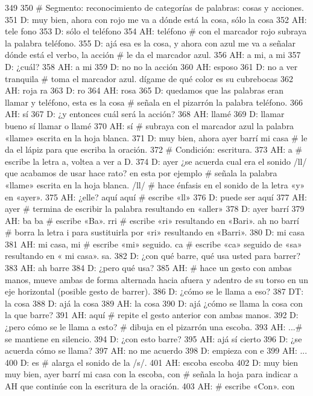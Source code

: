 349 
350 # Segmento: reconocimiento de categorías de palabras: cosas y acciones.
351 D: muy bien, ahora con rojo me va a dónde está la cosa, sólo la cosa
352 AH: tele fono
353 D: sólo el teléfono
354 AH: teléfono # con el marcador rojo subraya la palabra teléfono.
355 D: ajá esa es la cosa, y ahora con azul me va a señalar dónde está el verbo, la acción # le da el marcador azul.
356 AH: a mi, a mi
357 D: ¿cuál?
358 AH: a mi
359 D: no no la acción
360 AH: esposo
361 D: no a ver tranquila # toma el marcador azul. dígame de qué color es su cubrebocas
362 AH: roja ra
363 D: ro
364 AH: rosa
365 D: quedamos que las palabras eran llamar y teléfono, esta es la cosa # señala en el pizarrón la palabra teléfono.
366 AH: sí
367 D: ¿y entonces cuál será la acción?
368 AH: llamé
369 D: llamar bueno sí llamar o llamé
370 AH: sí # subraya con el marcador azul la palabra «llame» escrita en la hoja blanca.
371 D: muy bien, ahora ayer barrí mi casa # le da el lápiz para que escriba la oración.
372 # Condición: escritura.
373 AH: a # escribe la letra a, voltea a ver a D.
374 D: ayer ¿se acuerda cual era el sonido /ll/ que acabamos de usar hace rato? en esta por ejemplo # señala la palabra «llame» escrita en la hoja blanca. /ll/ # hace énfasis en el sonido de la letra «y» en «ayer».
375 AH: ¿elle? aquí aquí # escribe «ll»
376 D: puede ser aquí
377 AH: ayer # termina de escribir la palabra resultando en «aller»
378 D: ayer barrí
379 AH: ba ba # escribe «Ba». rri # escribe «ri» resultando en «Bari». ah no barrí # borra la letra i para sustituirla por «ri» resultando en «Barri».
380 D: mi casa
381 AH: mi casa, mi # escribe «mi» seguido. ca # escribe «ca» seguido de «sa» resultando en « mi casa». sa.
382 D: ¿con qué barre, qué usa usted para barrer?
383 AH: ah barre
384 D: ¿pero qué usa?
385 AH: # hace un gesto con ambas manos, mueve ambas de forma alternada hacia afuera y adentro de su torso en un eje horizontal (posible gesto de barrer).
386 D: ¿cómo se le llama a eso?
387 DT: la cosa
388 D: ajá la cosa
389 AH: la cosa
390 D: ajá ¿cómo se llama la cosa con la que barre?
391 AH: aquí # repite el gesto anterior con ambas manos.
392 D: ¿pero cómo se le llama a esto? # dibuja en el pizarrón una escoba.
393 AH: ...# se mantiene en silencio.
394 D: ¿con esto barre?
395 AH: ajá sí cierto
396 D: ¿se acuerda cómo se llama?
397 AH: no me acuerdo
398 D: empieza con e
399 AH: ...
400 D: es # alarga el sonido de la /s/.
401 AH: escoba escoba
402 D: muy bien muy bien, ayer barrí mi casa con la escoba, con # señala la hoja para indicar a AH que continúe con la escritura de la oración.
403 AH: # escribe «Con». con
